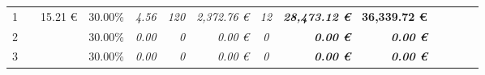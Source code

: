 \begin{table}[]
\begin{tabular}{cllllrrrcrrrrrr}
1                                                                                       & \multicolumn{2}{l}{\cellcolor[HTML]{FFFF99}\textit{}}                                & \multicolumn{1}{r}{\cellcolor[HTML]{FFFF99}15.21 €} & \multicolumn{1}{r}{\cellcolor[HTML]{FFFF99}30.00\%} & \cellcolor[HTML]{FFFF99}\textit{4.56}                             & \cellcolor[HTML]{FFFF99}\textit{120}                       & \textit{2,372.76 €}                                          & \cellcolor[HTML]{FFFF99}\textit{12}                       & \cellcolor[HTML]{92D050}\textit{\textbf{28,473.12 €}}                    & \cellcolor[HTML]{FFFF99}\textbf{36,339.72 €}                                  & \cellcolor[HTML]{92D050}\textit{}                     & \cellcolor[HTML]{FFFF99}\textit{}                     & \cellcolor[HTML]{BFBFBF}\textit{\textbf{}}                        & \textit{\textbf{}}                                             \\
2                                                                                       & \multicolumn{2}{l}{\cellcolor[HTML]{FFFF99}\textit{}}                                & \cellcolor[HTML]{FFFF99}                            & \multicolumn{1}{r}{\cellcolor[HTML]{FFFF99}30.00\%} & \cellcolor[HTML]{FFFF99}\textit{0.00}                             & \cellcolor[HTML]{FFFF99}\textit{0}                         & \textit{0.00 €}                                              & \cellcolor[HTML]{FFFF99}\textit{0}                        & \cellcolor[HTML]{92D050}\textit{\textbf{0.00 €}}                         & \cellcolor[HTML]{FFFF99}\textit{\textbf{0.00 €}}                              & \cellcolor[HTML]{92D050}\textit{}                     & \cellcolor[HTML]{FFFF99}\textit{}                     & \cellcolor[HTML]{BFBFBF}\textit{\textbf{}}                        & \textit{\textbf{}}                                             \\
3                                                                                       & \multicolumn{2}{l}{\cellcolor[HTML]{FFFF99}\textit{}}                                & \cellcolor[HTML]{FFFF99}                            & \multicolumn{1}{r}{\cellcolor[HTML]{FFFF99}30.00\%} & \cellcolor[HTML]{FFFF99}\textit{0.00}                             & \cellcolor[HTML]{FFFF99}\textit{0}                         & \textit{0.00 €}                                              & \cellcolor[HTML]{FFFF99}\textit{0}                        & \cellcolor[HTML]{92D050}\textit{\textbf{0.00 €}}                         & \cellcolor[HTML]{FFFF99}\textit{\textbf{0.00 €}}                              & \cellcolor[HTML]{92D050}\textit{}                     & \cellcolor[HTML]{FFFF99}\textit{}                     & \cellcolor[HTML]{BFBFBF}\textit{\textbf{}}                        & \textit{\textbf{}}                                             \\

\end{tabular}
\end{table}
